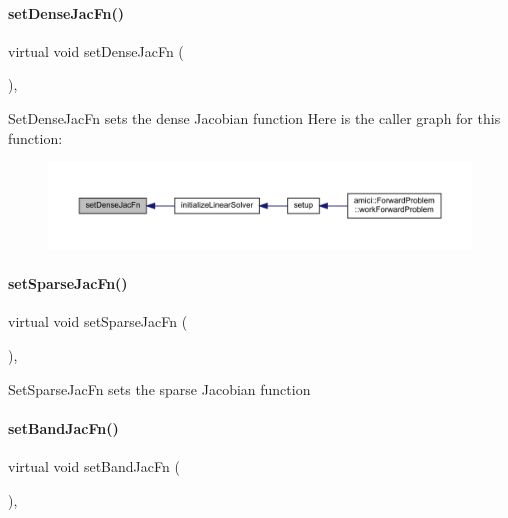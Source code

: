 \paragraph{\texorpdfstring{set\+Dense\+Jac\+Fn()}{setDenseJacFn()}}
{\footnotesize\ttfamily virtual void set\+Dense\+Jac\+Fn (\begin{DoxyParamCaption}{ }\end{DoxyParamCaption})\hspace{0.3cm}{\ttfamily [protected]}, {}}

Set\+Dense\+Jac\+Fn sets the dense Jacobian function Here is the caller graph for this function\+:
\nopagebreak
\begin{figure}[H]
\begin{center}
\leavevmode
\includegraphics[width=350pt]{classamici_1_1_solver_abb3355b298fb576e7bcd3f333d14b5af_icgraph}
\end{center}
\end{figure}
\mbox{\label{classamici_1_1_solver_aabf68f0f9ee981fd320420f3ba5c5f8d}} 
\paragraph{\texorpdfstring{set\+Sparse\+Jac\+Fn()}{setSparseJacFn()}}
{\footnotesize\ttfamily virtual void set\+Sparse\+Jac\+Fn (\begin{DoxyParamCaption}{ }\end{DoxyParamCaption})\hspace{0.3cm}{\ttfamily [protected]}, {}}

Set\+Sparse\+Jac\+Fn sets the sparse Jacobian function \mbox{\label{classamici_1_1_solver_a1ac4c2c1cf9df3c478ade2b1d5e728c6}} 
\paragraph{\texorpdfstring{set\+Band\+Jac\+Fn()}{setBandJacFn()}}
{\footnotesize\ttfamily virtual void set\+Band\+Jac\+Fn (\begin{DoxyParamCaption}{ }\end{DoxyParamCaption})\hspace{0.3cm}{\ttfamily [protected]}, {}}

